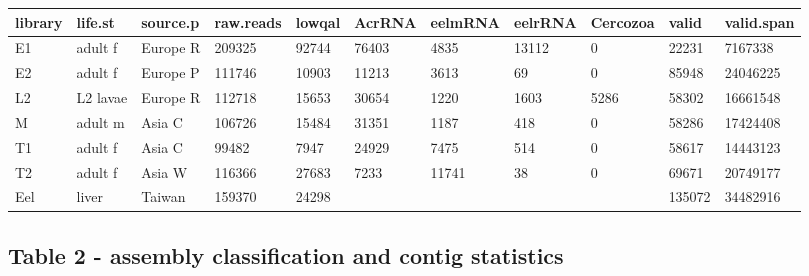 \documentclass[10pt]{bmc_article}
\newenvironment{bmcformat}{\begin{raggedright}\baselineskip20pt\sloppy\setboolean{publ}{false}}{\end{raggedright}\baselineskip20pt\sloppy}
\begin{document}
\begin{bmcformat}
\begin{tabular}{lllllllllll}
  \hline
library & life.st & source.p & raw.reads & lowqal & AcrRNA & eelmRNA & eelrRNA & Cercozoa & valid & valid.span \\ 
  \hline
E1 & adult f & Europe R & 209325 & 92744 & 76403 & 4835 & 13112 & 0 & 22231 & 7167338 \\ 
  E2 & adult f & Europe P & 111746 & 10903 & 11213 & 3613 & 69 & 0 & 85948 & 24046225 \\ 
  L2 & L2 lavae & Europe R & 112718 & 15653 & 30654 & 1220 & 1603 & 5286 & 58302 & 16661548 \\ 
  M & adult m & Asia C & 106726 & 15484 & 31351 & 1187 & 418 & 0 & 58286 & 17424408 \\ 
  T1 & adult f & Asia C & 99482 & 7947 & 24929 & 7475 & 514 & 0 & 58617 & 14443123 \\ 
  T2 & adult f & Asia W & 116366 & 27683 & 7233 & 11741 & 38 & 0 & 69671 & 20749177 \\ 
  Eel & liver & Taiwan & 159370 & 24298 &  &  &  &  & 135072 & 34482916 \\ 
   \hline
\end{tabular}
\subsection*{Table 2 - assembly classification and contig statistics}


\end{bmcformat}
\end{document}
